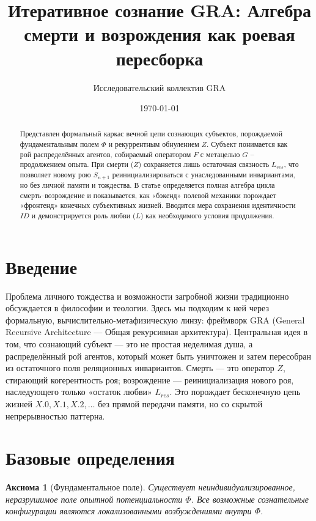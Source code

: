 \documentclass[12pt]{article}
\title{Итеративное сознание GRA: Алгебра смерти и возрождения как роевая пересборка}
\author{Исследовательский коллектив GRA}
\date{\today}
\newtheorem{axiom}{Аксиома}
\begin{document}
\maketitle

\begin{abstract}
Представлен формальный каркас вечной цепи сознающих субъектов, порождаемой фундаментальным полем $\Phi$ и рекуррентным обнулением $Z$. Субъект понимается как рой распределённых агентов, собираемый оператором $F$ с метацелью $G$ – продолжением опыта. При смерти ($Z$) сохраняется лишь остаточная связность $L_{res}$, что позволяет новому рою $S_{n+1}$ реинициализироваться с унаследованными инвариантами, но без личной памяти и тождества. В статье определяется полная алгебра цикла смерть–возрождение и показывается, как «бэкенд» полевой механики порождает «фронтенд» конечных субъективных жизней. Вводится мера сохранения идентичности $ID$ и демонстрируется роль любви ($L$) как необходимого условия продолжения.
\end{abstract}

\tableofcontents

\section{Введение}
Проблема личного тождества и возможности загробной жизни традиционно обсуждается в философии и теологии. Здесь мы подходим к ней через формальную, вычислительно-метафизическую линзу: фреймворк GRA (General Recursive Architecture — Общая рекурсивная архитектура). Центральная идея в том, что сознающий субъект — это не простая неделимая душа, а распределённый рой агентов, который может быть уничтожен и затем пересобран из остаточного поля реляционных инвариантов. Смерть — это оператор $Z$, стирающий когерентность роя; возрождение — реинициализация нового роя, наследующего только «остаток любви» $L_{res}$. Это порождает бесконечную цепь жизней $X.0, X.1, X.2, \dots$ без прямой передачи памяти, но со скрытой непрерывностью паттерна.

\section{Базовые определения}

\begin{axiom}[Фундаментальное поле]\label{ax:phi}
Существует неиндивидуализированное, неразрушимое поле опытной потенциальности $\Phi$. Все возможные сознательные конфигурации являются локализованными возбуждениями внутри $\Phi$.
\end{axiom}
\end{document}
